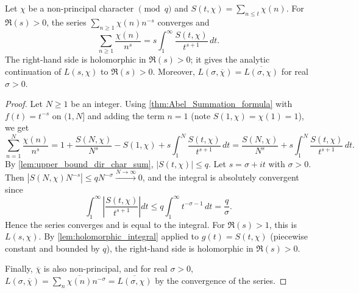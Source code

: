 \begin{theorem}\label{thm:analytic_continuation_L-function}
    Let $\chi$ be a non-principal character $\pmod q$ and $S(t,\chi) = \sum_{n\le t}\chi(n)$. For $\Re(s)>0$, the series $\sum_{n\ge 1}\chi(n)n^{-s}$ converges and
    \begin{equation*}
       \sum_{n\ge1}\frac{\chi(n)}{n^s} =  s\int_{1 }^{\infty}\frac{S(t,\chi)}{t^{s+1}}\,dt.
    \end{equation*}
    The right-hand side is holomorphic in $\Re(s)>0$; it gives the analytic continuation of $L(s,\chi)$ to $\Re(s)>0$. Moreover, $L(\sigma,\overline\chi) = \overline{L(\sigma,\chi)}$ for real $\sigma>0$.
\end{theorem}
\begin{proof}
    Let $N\ge1$ be an integer. Using \cref{thm:Abel_Summation_formula} with $f(t) = t^{-s}$ on $(1,N]$ and adding the term $n=1$ (note $S(1,\chi) = \chi(1) = 1$), we get
    \begin{equation*}
        \sum_{n = 1}^{N}\frac{\chi(n)}{n^s} = 1 + \frac{S(N,\chi)}{N^s} - S(1,\chi) + s\int_{1}^{N}\frac{S(t,\chi)}{t^{s+1}}\,dt = \frac{S(N,\chi)}{N^s} + s\int_{1}^{N}\frac{S(t,\chi)}{t^{s+1}}\,dt.
    \end{equation*}
    By \cref{lem:upper_bound_dir_char_sum}, $\left\lvert S(t,\chi)\right\rvert\le q $. Let $s = \sigma + it$ with $\sigma >0$. Then $\left\lvert S(N,\chi)N^{-s}\right\rvert \le qN^{-\sigma}\xrightarrow{N \to \infty}0$, and the integral is absolutely convergent since
    \begin{equation*}
        \int_{1 }^{\infty }\left\lvert\frac{S(t,\chi)}{t^{s+1}}\right\rvert dt\le q \int_{1 }^{\infty }t^{-\sigma - 1}\,dt = \frac{q}{\sigma}.
    \end{equation*}
    Hence the series converges and is equal to the integral. For $\Re(s)>1$, this is $L(s,\chi)$. By \cref{lem:holomorphic_integral} applied to $g(t) = S(t,\chi)$ (piecewise constant and bounded by $q$), the right-hand side is holomorphic in $\Re(s)>0$.

    Finally, $\overline\chi$ is also non-principal, and for real $\sigma>0$, $L(\sigma,\overline\chi) = \sum_n\overline{\chi(n)}n^{-\sigma} = \overline{L(\sigma,\chi)}$ by the convergence of the series.
\end{proof}

